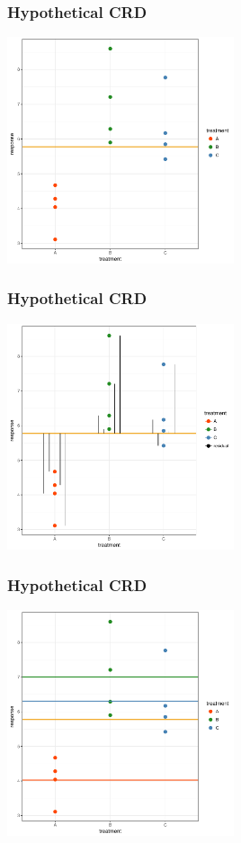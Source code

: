\begin{frame}\frametitle{Hypothetical CRD}
\centering
\includegraphics[width=0.5\textwidth]{hypcrd_overallmean.pdf}
\end{frame}

\begin{frame}\frametitle{Hypothetical CRD}
\centering
\includegraphics[width=0.5\textwidth]{hypcrd_totss.pdf}
\end{frame}


\begin{frame}\frametitle{Hypothetical CRD}
\centering
\includegraphics[width=0.5\textwidth]{hypcrd_trtmean.pdf}
\end{frame}

